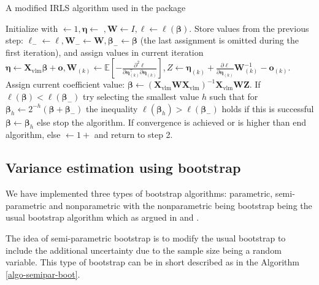 \documentclass[
]{jss}
\newcommand{\1}{\mathcal{I}} \newcommand{\bZero}{\boldsymbol{0}}
\begin{document}
\begin{algorithm}[ht!]
\small
\caption{A modified IRLS algorithm used in the  package}
\label{algo-estimation}\DontPrintSemicolon
{} Initialize with $\leftarrow 1, \boldsymbol{\eta}\leftarrow$
    $, \boldsymbol{W}\leftarrow I, \ell\leftarrow\ell(\boldsymbol{\beta})$.\;
 Store values from the previous step: 
    $\ell_{-}\leftarrow\ell, \boldsymbol{W}_{-}\leftarrow\boldsymbol{W}, \boldsymbol{\beta}_{-}\leftarrow\boldsymbol{\beta}$ 
    (the last assignment is omitted during the first iteration), and assign values in current iteration 
    $\displaystyle\boldsymbol{\eta}\leftarrow\boldsymbol{X}_{\text{vlm}}\boldsymbol{\beta}+\boldsymbol{o}, \boldsymbol{W}_{(k)}\leftarrow\mathbb{E}\left[-\frac{\partial^{2}\ell}{\partial\boldsymbol{\eta}_{(k)}^\top\partial\boldsymbol{\eta}_{(k)}}\right], Z\leftarrow\boldsymbol{\eta}_{(k)}+\frac{\partial\ell}{\partial\boldsymbol{\eta}_{(k)}}\boldsymbol{W}_{(k)}^{-1}-\boldsymbol{o}_{(k)}$.\;
 Assign current coefficient value: 
    $\boldsymbol{\beta}\leftarrow\left(\boldsymbol{X}_{\text{vlm}}\boldsymbol{W}\boldsymbol{X}_{\text{vlm}}\right)^{-1}\boldsymbol{X}_{\text{vlm}}\boldsymbol{W}\boldsymbol{Z}$.\;
 If $\ell(\boldsymbol{\beta})<\ell(\boldsymbol{\beta}_{-})$ try selecting the smallest value $h$ such that for
    $\boldsymbol{\beta}_{h}\leftarrow2^{-h}\left(\boldsymbol{\beta}+\boldsymbol{\beta}_{-}\right)$ the inequality $\ell(\boldsymbol{\beta}_{h})>\ell(\boldsymbol{\beta}_{-})$ 
    holds if this is successful $\boldsymbol{\beta}\leftarrow\boldsymbol{\beta}_{h}$ else stop the algorithm.\;
 If convergence is achieved or  is higher than  end algorithm, 
    else $\leftarrow 1+$ and return to step 2.
\end{algorithm}

\subsection{Variance estimation using bootstrap}\label{sec-boostrap}

We have implemented three types of bootstrap algorithms: parametric,
semi-parametric and nonparametric with the nonparametric being bootstrap
being the usual bootstrap algorithm which as argued in \cite{norrpoll}
and \cite{zwane}.

The idea of semi-parametric bootstrap is to modify the usual bootstrap
to include the additional uncertainty due to the sample size being a
random variable. This type of bootstrap can be in short described as in
the Algorithm \ref{algo-semipar-boot}.
\end{document}
